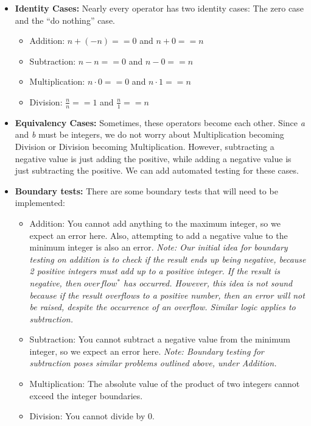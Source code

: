 \documentclass{article}
\begin{document}
\begin{itemize}

    \item \textbf{Identity Cases:} Nearly every operator has two
        identity cases: The zero case and the ``do nothing'' case.

        \begin{itemize}
            \item Addition: $n + (-n) == 0$ and  $n + 0 == n$
            \item Subtraction: $n - n == 0$ and $n - 0 == n$
            \item Multiplication: $n \cdot 0 == 0$ and $n \cdot
                1 == n$
            \item Division: $\frac{n}{n} == 1$ and $\frac{n}{1} == n$
        \end{itemize}

    \item \textbf{Equivalency Cases:} Sometimes, these operators
        become each other. Since \textit{a} and \textit{b} must be
        integers, we do not worry about Multiplication becoming
        Division or Division becoming Multiplication. However,
        subtracting a negative value is just adding the positive,
        while adding a negative value is just subtracting the
        positive. We can add automated testing for these cases.

    \item \textbf{Boundary tests:} There are some boundary tests that
    will need to be implemented:

        \begin{itemize}
            \item Addition: You cannot add anything to the maximum
                integer, so we expect an error here. Also, attempting
                to add a negative value to the minimum integer is also
                an error. \textit{Note: Our initial idea for boundary
                testing on addition is to check if the result ends up
                being negative, because 2 positive integers must add
                up to a positive integer. If the result is negative,
                then $overflow^*$ has occurred. However, this idea is
                not sound because if the result overflows to a
                positive number, then an error will not be raised,
                despite the occurrence of an overflow. Similar logic
                applies to subtraction.}
            \item Subtraction: You cannot subtract a negative value
                from the minimum integer, so we expect an error here.
                \textit{Note: Boundary testing for subtraction poses
                similar problems outlined above, under Addition.}
            \item Multiplication: The absolute value of the product of
                two integers cannot exceed the integer boundaries.
            \item Division: You cannot divide by 0.
        \end{itemize}

\end{itemize}
\end{document}
